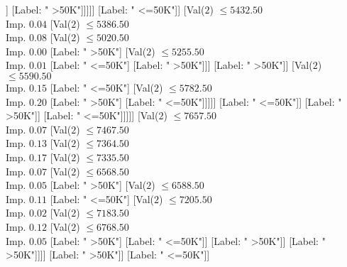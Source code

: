 \documentclass[margin=10pt]{standalone}
\begin{document}
\begin{forest}
																								[Label: " <=50K"]
																								[Val($2$) $ \leq 4119.50$ \\ Imp. $0.01$
																									[Val($2$) $ \leq 3805.50$ \\ Imp. $0.02$
																										[Label: " >50K"]
																										[Label: " <=50K"]]
																									[Label: " >50K"]]]]]
																					[Label: " <=50K"]]
																				[Val($2$) $ \leq 5432.50$ \\ Imp. $0.04$
																					[Val($2$) $ \leq 5386.50$ \\ Imp. $0.08$
																						[Val($2$) $ \leq 5020.50$ \\ Imp. $0.00$
																							[Label: " >50K"]
																							[Val($2$) $ \leq 5255.50$ \\ Imp. $0.01$
																								[Label: " <=50K"]
																								[Label: " >50K"]]]
																						[Label: " >50K"]]
																					[Val($2$) $ \leq 5590.50$ \\ Imp. $0.15$
																						[Label: " <=50K"]
																						[Val($2$) $ \leq 5782.50$ \\ Imp. $0.20$
																							[Label: " >50K"]
																							[Label: " <=50K"]]]]]
																			[Label: " <=50K"]]
																		[Label: " >50K"]]
																	[Label: " <=50K"]]]]]
													[Val($2$) $ \leq 7657.50$ \\ Imp. $0.07$
														[Val($2$) $ \leq 7467.50$ \\ Imp. $0.13$
															[Val($2$) $ \leq 7364.50$ \\ Imp. $0.17$
																[Val($2$) $ \leq 7335.50$ \\ Imp. $0.07$
																	[Val($2$) $ \leq 6568.50$ \\ Imp. $0.05$
																		[Label: " >50K"]
																		[Val($2$) $ \leq 6588.50$ \\ Imp. $0.11$
																			[Label: " <=50K"]
																			[Val($2$) $ \leq 7205.50$ \\ Imp. $0.02$
																				[Val($2$) $ \leq 7183.50$ \\ Imp. $0.12$
																					[Val($2$) $ \leq 6768.50$ \\ Imp. $0.05$
																						[Label: " >50K"]
																						[Label: " <=50K"]]
																					[Label: " >50K"]]
																				[Label: " >50K"]]]]
																	[Label: " >50K"]]
																[Label: " <=50K"]]

\end{forest}
\end{document}
